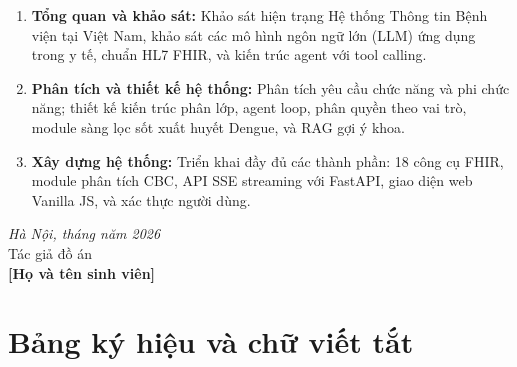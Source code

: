 \documentclass[oneside, a4paper]{book}
\theoremstyle{plain}
\theoremstyle{plain}
\theoremstyle{definition}
\theoremstyle{remark}
\begin{document}
\begin{enumerate}
\item \textbf{Tổng quan và khảo sát:} Khảo sát hiện trạng Hệ thống Thông tin Bệnh viện tại Việt Nam, khảo sát các mô hình ngôn ngữ lớn (LLM) ứng dụng trong y tế, chuẩn HL7 FHIR, và kiến trúc agent với tool calling.

\item \textbf{Phân tích và thiết kế hệ thống:} Phân tích yêu cầu chức năng và phi chức năng; thiết kế kiến trúc phân lớp, agent loop, phân quyền theo vai trò, module sàng lọc sốt xuất huyết Dengue, và RAG gợi ý khoa.

\item \textbf{Xây dựng hệ thống:} Triển khai đầy đủ các thành phần: 18 công cụ FHIR, module phân tích CBC, API SSE streaming với FastAPI, giao diện web Vanilla JS, và xác thực người dùng.
\end{enumerate}

\hspace{0.5\textwidth}
\begin{minipage}{0.5\textwidth}
	\noindent\begin{center}
		\vspace{1cm}
		\textit{Hà Nội, tháng \hspace{0.4cm} năm 2026} \\
		Tác giả đồ án\\ \vspace{2cm}
		\textbf{[Họ và tên sinh viên]}
	\end{center}
\end{minipage}

\tableofcontents
\pagestyle{myheadings}

\newpage

\thispagestyle{empty}
\setcounter{page}{1}
\chapter*{Bảng ký hiệu và chữ viết tắt}
\end{document}
